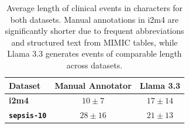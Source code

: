\begin{table}[htbp]
\caption{Average length of clinical events in characters for both datasets. Manual annotations in i2m4 are significantly shorter due to frequent abbreviations and structured text from MIMIC tables, while Llama 3.3 generates events of comparable length across datasets.}
\ChSixTableBodyStart
\begin{ChSixFloatBody}

\centering
\begin{tabular}{|l|c|c|}
\hline
\textbf{Dataset} & \textbf{Manual Annotator} & \textbf{Llama 3.3} \\ \hline
\textbf{i2m4}    & $10\pm7 $                              & $17\pm14$                        \\ \hline
\textbf{\texttt{sepsis-10}} & $28\pm16$                            & $21\pm13$                        \\ \hline
\end{tabular}



\end{ChSixFloatBody}
\end{table}